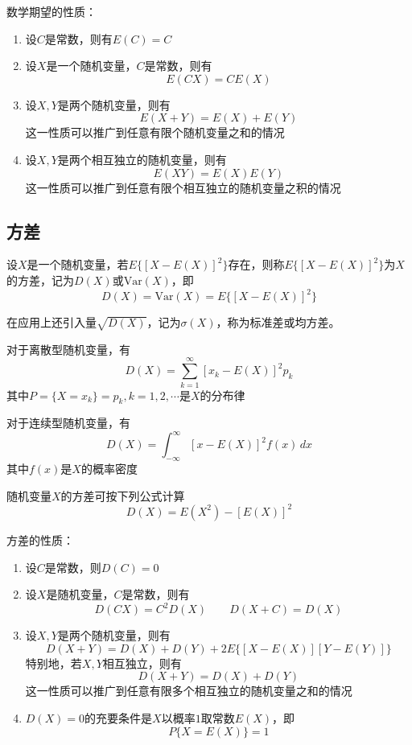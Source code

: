 \begin{theorem}
    数学期望的性质：
    \begin{enumerate}[$1^\circ$]
        \item 设$C$是常数，则有$E(C)=C$
        \item 设$X$是一个随机变量，$C$是常数，则有$$E(CX)=CE(X)$$
        \item 设$X,Y$是两个随机变量，则有$$E(X+Y)=E(X)+E(Y)$$这一性质可以推广到任意有限个随机变量之和的情况
        \item 设$X,Y$是两个相互独立的随机变量，则有$$E(XY)=E(X)E(Y)$$这一性质可以推广到任意有限个相互独立的随机变量之积的情况
    \end{enumerate}
\end{theorem}

\subsection{方差}
\begin{definition}[方差]
    设$X$是一个随机变量，若$E\{{[X-E(X)]}^2\}$存在，则称$E\{{[X-E(X)]}^2\}$为$X$的方差，记为$D(X)$或$\mathrm{Var}(X)$，即
    $$D(X)=\mathrm{Var}(X)=E\{{[X-E(X)]}^2\}$$

    在应用上还引入量$\sqrt{D(X)}$，记为$\sigma(X)$，称为{\heiti 标准差}或{\heiti 均方差}。

    对于离散型随机变量，有$$D(X)=\sum _{k=1}^\infty {[x_k-E(X)]}^2p_k$$
    其中$P=\{X=x_k\}=p_k,k=1,2,\cdots$是$X$的分布律

    对于连续型随机变量，有$$D(X)=\int _{-\infty}^\infty {[x-E(X)]}^2f(x)\,dx$$
    其中$f(x)$是$X$的概率密度

    随机变量$X$的方差可按下列公式计算$$D(X)=E(X^2)-{[E(X)]}^2$$
\end{definition}

\begin{theorem}
    方差的性质：
    \begin{enumerate}[$1^\circ$]
        \item 设$C$是常数，则$D(C)=0$
        \item 设$X$是随机变量，$C$是常数，则有$$D(CX)=C^2D(X)\qquad  D(X+C)=D(X)$$
        \item 设$X,Y$是两个随机变量，则有$$D(X+Y)=D(X)+D(Y)+2E\{[X-E(X)][Y-E(Y)]\}$$特别地，若$X,Y$相互独立，则有$$D(X+Y)=D(X)+D(Y)$$这一性质可以推广到任意有限多个相互独立的随机变量之和的情况
        \item $D(X)=0$的充要条件是$X$以概率$1$取常数$E(X)$，即$$P\{X=E(X)\}=1$$
    \end{enumerate}
\end{theorem}

